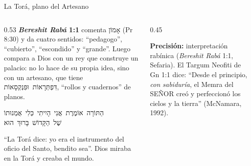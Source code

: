 \documentclass[hyperref={bookmarks=false},aspectratio=169]{beamer}
\newcommand{\heb}[1]{\mbox{\foreignlanguage{hebrew}{#1}}}
\newcommand{\SENOR}{S{\fontsize{0.78em}{1em}\selectfont EÑOR}}
\newcommand{\precision}[1]{{\footnotesize\color{gris}\textbf{Precisión:} #1}}
\begin{document}
\begin{frame}{La Torá, plano del Artesano}
\begin{columns}[t,onlytextwidth]
\begin{column}{0.53\textwidth}\scriptsize
\textbf{\emph{Bereshit Rabá} 1:1} comenta \heb{אָמוֹן} (Pr 8:30) y da cuatro sentidos: ``pedagogo'', ``cubierto'', ``escondido'' y ``grande''. Luego compara a Dios con un rey que construye un palacio: no lo hace de su propia idea, sino con un artesano, que tiene \heb{דִּפְתְּרָאוֹת וּפִנְקְסָאוֹת}, ``rollos y cuadernos'' de planos.
\begin{center}\heb{הַתּוֹרָה אוֹמֶרֶת אֲנִי הָיִיתִי כְּלִי אֻמְנוּתוֹ}\\ \heb{שֶׁל הַקָּדוֹשׁ בָּרוּךְ הוּא}\end{center}
``La Torá dice: yo era el instrumento del oficio del Santo, bendito sea''. Dios miraba en la Torá y creaba el mundo.
\end{column}
\begin{column}{0.45\textwidth}
\centering
{}\par\smallskip
\precision{interpretación rabínica (\emph{Bereshit Rabá} 1:1, Sefaria). El Targum Neofiti de Gn 1:1 dice: ``Desde el principio, \emph{con sabiduría}, el Memra del \SENOR{} creó y perfeccionó los cielos y la tierra'' (McNamara, 1992).}
\end{column}
\end{columns}
\end{frame}
\end{document}
